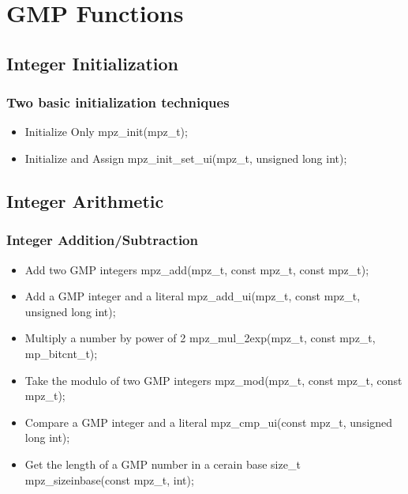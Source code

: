 \section{GMP Functions}


\subsection{Integer Initialization}

\begin{frame}
\frametitle{Two basic initialization techniques}
  \begin{itemize}
    \item Initialize Only
    mpz\_init(mpz\_t);
    \item Initialize and Assign
    mpz\_init\_set\_ui(mpz\_t, unsigned long int);
  \end{itemize}
\end{frame}


\subsection{Integer Arithmetic}

\begin{frame}
\frametitle{Integer Addition/Subtraction}
  \begin{itemize}
    \item Add two GMP integers
    mpz\_add(mpz\_t, const mpz\_t, const mpz\_t);
    \item Add a GMP integer and a literal
    mpz\_add\_ui(mpz\_t, const mpz\_t, unsigned long int);
    \item Multiply a number by power of 2
    mpz\_mul\_2exp(mpz\_t, const mpz\_t, mp\_bitcnt\_t);
    \item Take the modulo of two GMP integers
    mpz\_mod(mpz\_t, const mpz\_t, const mpz\_t);
    \item Compare a GMP integer and a literal
    mpz\_cmp\_ui(const mpz\_t, unsigned long int);
    \item Get the length of a GMP number in a cerain base
    size\_t mpz\_sizeinbase(const mpz\_t, int);
  \end{itemize}
\end{frame}


